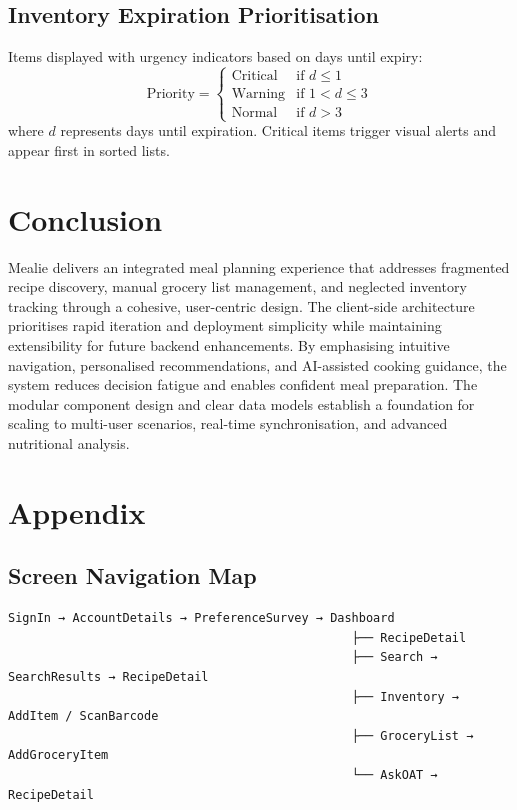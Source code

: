 \documentclass[12pt]{article}
\begin{document}
\subsection{Inventory Expiration Prioritisation}
Items displayed with urgency indicators based on days until expiry:
\begin{equation}
  \text{Priority} = \begin{cases}
    \text{Critical} & \text{if } d \leq 1 \\
    \text{Warning} & \text{if } 1 < d \leq 3 \\
    \text{Normal} & \text{if } d > 3
  \end{cases}
\end{equation}
where $d$ represents days until expiration. Critical items trigger visual alerts and appear first in sorted lists.

\section{Conclusion}
Mealie delivers an integrated meal planning experience that addresses fragmented recipe discovery, manual grocery list management, and neglected inventory tracking through a cohesive, user-centric design. The client-side architecture prioritises rapid iteration and deployment simplicity while maintaining extensibility for future backend enhancements. By emphasising intuitive navigation, personalised recommendations, and AI-assisted cooking guidance, the system reduces decision fatigue and enables confident meal preparation. The modular component design and clear data models establish a foundation for scaling to multi-user scenarios, real-time synchronisation, and advanced nutritional analysis.

\section{Appendix}
\subsection{Screen Navigation Map}
\begin{verbatim}
SignIn → AccountDetails → PreferenceSurvey → Dashboard
                                                ├── RecipeDetail
                                                ├── Search → SearchResults → RecipeDetail
                                                ├── Inventory → AddItem / ScanBarcode
                                                ├── GroceryList → AddGroceryItem
                                                └── AskOAT → RecipeDetail
\end{verbatim}
\end{document}
